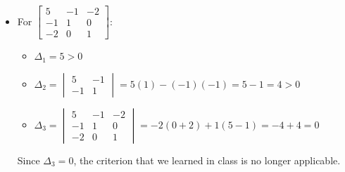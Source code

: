 \documentclass{article}
\begin{document}
\begin{itemize}
\item For $\begin{bmatrix} 5 & -1 & -2 \\ -1 & 1 & 0 \\ -2 & 0 & 1 \end{bmatrix}$:
\begin{itemize}
\item $\Delta_1 = 5 > 0$
\item $\Delta_2 = \begin{vmatrix} 5 & -1 \\ -1 & 1 \end{vmatrix} = 5(1) - (-1)(-1) = 5 - 1 = 4 > 0$
\item $\Delta_3 = \begin{vmatrix} 5 & -1 & -2 \\ -1 & 1 & 0 \\ -2 & 0 & 1 \end{vmatrix} = -2(0 + 2) + 1(5 - 1) = -4 + 4 = 0$
\end{itemize}
Since $\Delta_3 = 0$, the criterion that we learned in class is no longer applicable. \\


\end{itemize}
\end{document}
